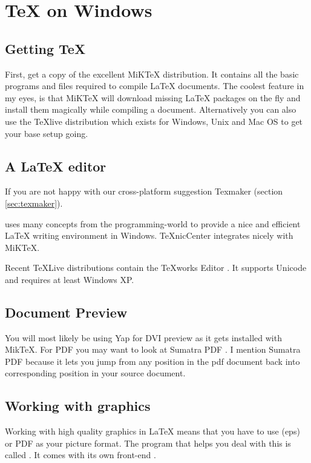 \section{\TeX{} on Windows}

\subsection{Getting \TeX{}}

First, get a copy of the excellent MiK\TeX{} \cite{miktex} distribution.
It contains all the basic programs and files
required to compile \LaTeX{} documents.  The coolest feature in my eyes, is
that MiK\TeX{} will download missing \LaTeX{} packages on the fly and install them
magically while compiling a document. Alternatively you can also use
the TeXlive \cite{texlive} distribution which exists for Windows, Unix and Mac OS to
get your base setup going.

\subsection{A \LaTeX{} editor}

If you are not happy with our cross-platform suggestion Texmaker (section \ref{sec:texmaker}).

 \cite{texniccenter} uses many concepts from the programming-world to provide a nice and
efficient \LaTeX{} writing environment in Windows. TeXnicCenter integrates nicely with
MiKTeX.

Recent \TeX Live distributions contain the \TeX{}works Editor \cite{texworks}.
It supports Unicode and requires at least Windows XP.

\subsection{Document Preview}

You will most likely be using Yap for DVI preview as it gets installed with
MikTeX. For PDF you may want to look at Sumatra
PDF \cite{sumatrapdf}. I mention Sumatra PDF
because it lets you jump from any position in the pdf document back into
corresponding position in your source document.

\subsection{Working with graphics}

Working with high quality graphics in \LaTeX{} means that you have to use
\EPSi{} (eps) or PDF as your picture format. The program that helps you
deal with this is called  \cite{ghostscript}. It comes with its
own front-end .

